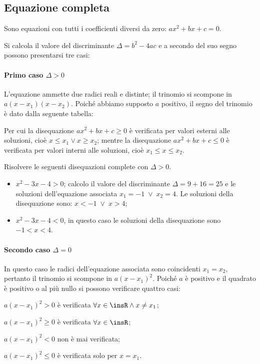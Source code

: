\subsection{Equazione completa}
Sono equazioni con tutti i coefficienti diversi da zero: $ax^2+bx+c=0$.

Si calcola il valore del discriminante $\Delta =b^2-4{ac}$ e a secondo del suo segno possono presentarsi tre casi:
\paragraph{Primo caso $\Delta >0$}
L'equazione ammette due radici reali e distinte; il trinomio si scompone in $a(x-x_1)(x-x_2)$. Poiché abbiamo supposto $a$ positivo, il segno del trinomio è dato dalla seguente tabella:
\begin{center}

\end{center}
Per cui la disequazione ${ax}^2+{bx}+c\ge 0$ è verificata per valori esterni alle soluzioni, cioè $x\le x_1\vee x\ge x_2$; mentre la disequazione ${ax}^2+{bx}+c\le 0$ è verificata per valori interni alle soluzioni, cioè $x_1\le x\le x_2$.

\begin{exrig}
\begin{esempio}
Risolvere le seguenti disequazioni complete con $\Delta>0$.
\begin{itemize}
\item $x^2-3x-4>0$; calcolo il valore del discriminante $\Delta =9+16=25$ e le soluzioni dell’equazione associata $x_1=-1\;\vee \;x_2=4$. Le soluzioni della disequazione sono: $x<-1\;\vee \;x>4$;
\item $x^2-3x-4<0$, in questo caso le soluzioni della disequazione sono $-1<x<4$.
\end{itemize}
\end{esempio}
\end{exrig}

\paragraph{Secondo caso $\Delta =0$} In questo caso le radici dell'equazione associata sono coincidenti $x_1=x_2$, pertanto il trinomio si scompone in $a(x-x_1)^2$. Poiché $a$ è positivo e il quadrato è positivo o al più nullo si possono verificare quattro casi:

\begin{itemize*}
\item $a(x-x_1)^2>0$ è verificata $\forall x\in \insR\wedge x\neq x_1$;
\item $a(x-x_1)^2\ge 0$ è verificata $\forall x\in \insR$;
\item $a(x-x_1)^2<0$ non è mai verificata;
\item $a(x-x_1)^2\le 0$ è verificata solo per $x=x_1$.
\end{itemize*}

